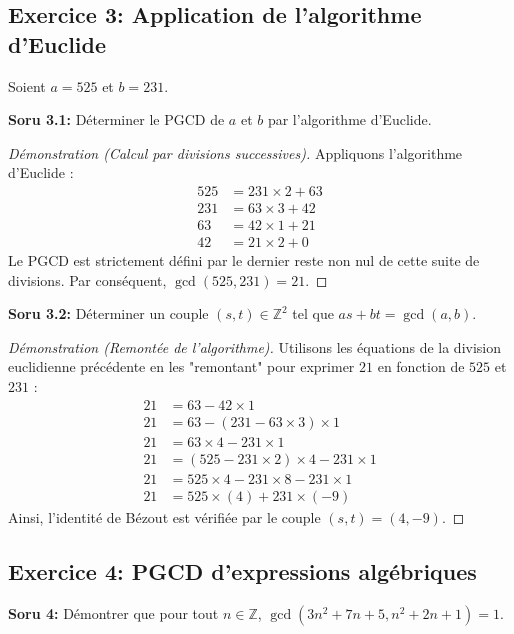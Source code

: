 \documentclass[12pt,a4paper]{report}
\begin{document}
\subsection*{Exercice 3: Application de l'algorithme d'Euclide}
Soient $a = 525$ et $b = 231$.

\textbf{Soru 3.1:} Déterminer le PGCD de $a$ et $b$ par l'algorithme d'Euclide.

\begin{proof}[Démonstration (Calcul par divisions successives)]
Appliquons l'algorithme d'Euclide :
\begin{align*}
525 &= 231 \times 2 + 63 \\
231 &= 63 \times 3 + 42 \\
63 &= 42 \times 1 + 21 \\
42 &= 21 \times 2 + 0
\end{align*}
Le PGCD est strictement défini par le dernier reste non nul de cette suite de divisions. Par conséquent, $\gcd(525, 231) = 21$.
\end{proof}

\textbf{Soru 3.2:} Déterminer un couple $(s, t) \in \mathbb{Z}^2$ tel que $as + bt = \gcd(a, b)$.

\begin{proof}[Démonstration (Remontée de l'algorithme)]
Utilisons les équations de la division euclidienne précédente en les "remontant" pour exprimer $21$ en fonction de $525$ et $231$ :
\begin{align*}
21 &= 63 - 42 \times 1 \\
21 &= 63 - (231 - 63 \times 3) \times 1 \\
21 &= 63 \times 4 - 231 \times 1 \\
21 &= (525 - 231 \times 2) \times 4 - 231 \times 1 \\
21 &= 525 \times 4 - 231 \times 8 - 231 \times 1 \\
21 &= 525 \times (4) + 231 \times (-9)
\end{align*}
Ainsi, l'identité de Bézout est vérifiée par le couple $(s, t) = (4, -9)$.
\end{proof}

\subsection*{Exercice 4: PGCD d'expressions algébriques}
\textbf{Soru 4:} Démontrer que pour tout $n \in \mathbb{Z}$, $\gcd(3n^2 + 7n + 5, n^2 + 2n + 1) = 1$.
\end{document}

